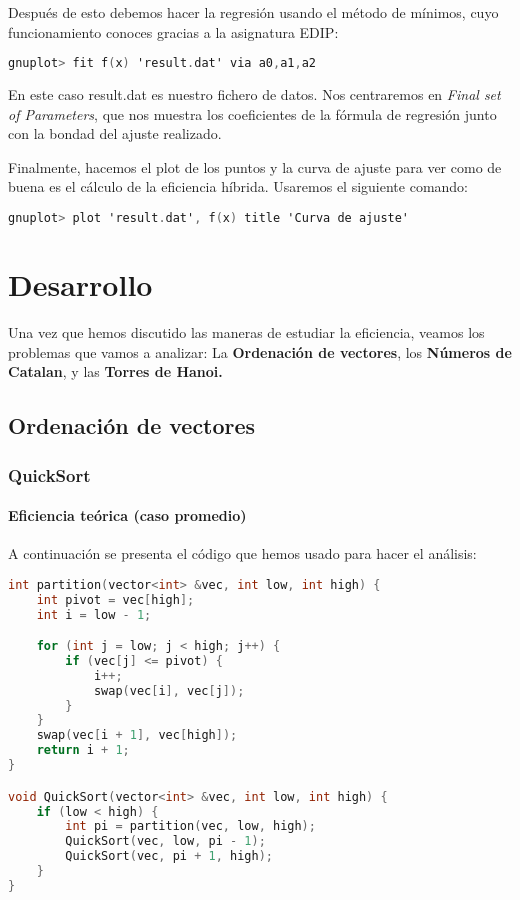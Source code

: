 \documentclass[a4paper,12pt]{article} %
\begin{document}
Después de esto debemos hacer la regresión usando el método de mínimos, cuyo funcionamiento conoces gracias a la asignatura EDIP:

\begin{lstlisting}[language=C, caption={Uso de gnuplot para la regresión}]
        gnuplot> fit f(x) 'result.dat' via a0,a1,a2
         \end{lstlisting}

En este caso result.dat es nuestro fichero de datos.
Nos centraremos en \textit{Final set of Parameters}, que nos muestra los coeficientes de la fórmula de regresión
junto con la bondad del ajuste realizado.

Finalmente, hacemos el plot de los puntos y la curva de ajuste para ver como de buena es el cálculo de la eficiencia híbrida. Usaremos el
siguiente comando:

\begin{lstlisting}[language=C, caption={Representación de la regresión}]
        gnuplot> plot 'result.dat', f(x) title 'Curva de ajuste'
         \end{lstlisting}




\section{Desarrollo}
Una vez que hemos discutido las maneras de estudiar la eficiencia, veamos los problemas
que vamos a analizar: La \textbf{Ordenación de vectores},
los \textbf{Números de Catalan}, y las \textbf{Torres de Hanoi.}

\subsection{Ordenación de vectores}
\subsubsection{QuickSort}
\paragraph{Eficiencia teórica (caso promedio)}

A continuación se presenta el código que hemos usado para hacer el análisis:

\begin{lstlisting}[language=C++, caption={Código de QuickSort}]
int partition(vector<int> &vec, int low, int high) {
	int pivot = vec[high];
	int i = low - 1;

	for (int j = low; j < high; j++) {
		if (vec[j] <= pivot) {
			i++;
			swap(vec[i], vec[j]);
		}
	}
	swap(vec[i + 1], vec[high]);
	return i + 1;
}

void QuickSort(vector<int> &vec, int low, int high) {
	if (low < high) {
		int pi = partition(vec, low, high);
		QuickSort(vec, low, pi - 1);
		QuickSort(vec, pi + 1, high);
	}
}
\end{lstlisting}
\end{document}
